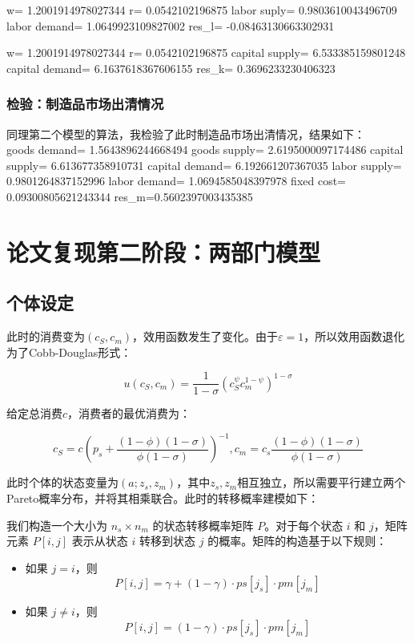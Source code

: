\documentclass[a4paper, 12pt]{ctexart}
\begin{document}
w= 1.2001914978027344 r= 0.0542102196875 labor suply= 0.9803610043496709 labor demand= 1.0649923109827002 res\_l= -0.08463130663302931

w= 1.2001914978027344 r= 0.0542102196875 capital supply= 6.533385159801248 capital demand= 6.1637618367606155 res\_k= 0.3696233230406323

\subsubsection{检验：制造品市场出清情况}
同理第二个模型的算法，我检验了此时制造品市场出清情况，结果如下：
\\ goods demand= 1.5643896244668494 goods supply= 2.6195000097174486 capital supply= 6.613677358910731 capital demand= 6.192661207367035 labor supply= 0.9801264837152996 labor demand= 1.0694585048397978 fixed cost= 0.09300805621243344
res\_m=0.5602397003435385

\newpage

\section{论文复现第二阶段：两部门模型}
\subsection{个体设定}
此时的消费变为$(c_S,c_m)$，效用函数发生了变化。由于$\varepsilon=1$，所以效用函数退化为了Cobb-Douglas形式：

$$
u(c_S,c_m)=\frac{1}{1-\sigma}(c_S^\psi c_m^{1-\psi})^{1-\sigma}
$$

给定总消费$c$，消费者的最优消费为：

$$
c_S=c\left(p_s+\frac{(1-\phi)(1-\sigma)}{\phi(1-\sigma)}\right)^{-1},c_m=c_s \frac{(1-\phi)(1-\sigma)}{\phi(1-\sigma)}
$$



此时个体的状态变量为$(a;z_s,z_m)$，其中$z_s,z_m$相互独立，所以需要平行建立两个
Pareto概率分布，并将其相乘联合。此时的转移概率建模如下：

我们构造一个大小为 \(n_s \times n_m\) 的状态转移概率矩阵 \(P\)。对于每个状态 \(i\) 和 \(j\)，矩阵元素 \(P[i, j]\) 表示从状态 \(i\) 转移到状态 \(j\) 的概率。矩阵的构造基于以下规则：

\begin{itemize}
    \item 如果 \(j = i\)，则
    \[
    P[i, j] = \gamma + (1-\gamma) \cdot ps[j_s] \cdot pm[j_m]
    \]
    \item 如果 \(j \neq i\)，则
    \[
    P[i, j] = (1-\gamma) \cdot ps[j_s] \cdot pm[j_m]
    \]
\end{itemize}
\end{document}
